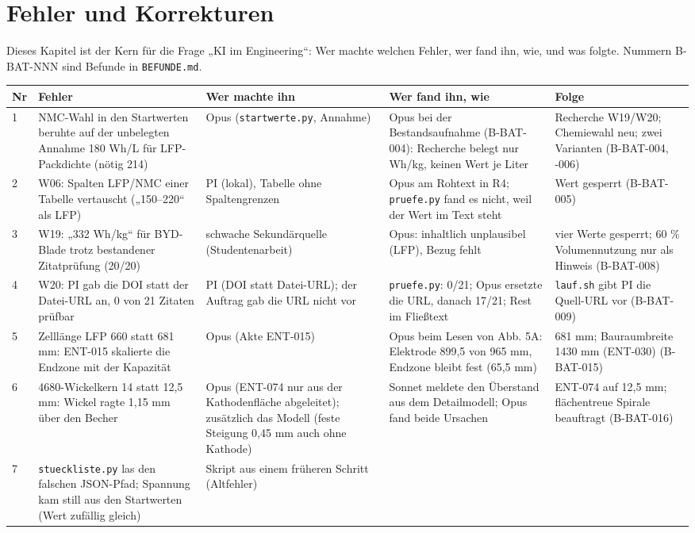 \documentclass[10pt,a4paper]{article}
\begin{document}
\section{Fehler und Korrekturen}\label{k:fehler}
Dieses Kapitel ist der Kern für die Frage „KI im Engineering“: Wer machte welchen Fehler, wer fand ihn, wie, und was folgte. Nummern B-BAT-NNN sind Befunde in \texttt{BEFUNDE.md}.
\begin{longtable}{@{}p{0.4cm}p{3.6cm}p{2.5cm}p{4.4cm}p{3.0cm}@{}}\toprule
\textbf{Nr} & \textbf{Fehler} & \textbf{Wer machte ihn} & \textbf{Wer fand ihn, wie} & \textbf{Folge}\\\midrule\endhead
1 & NMC-Wahl in den Startwerten beruhte auf der unbelegten Annahme 180 Wh/L für LFP-Packdichte (nötig 214) & Opus (\texttt{startwerte.py}, Annahme)
 & Opus bei der Bestandsaufnahme (B-BAT-004): Recherche belegt nur Wh/kg, keinen Wert je Liter & Recherche W19/W20; Chemiewahl neu; zwei Varianten (B-BAT-004, -006)\\
2 & W06: Spalten LFP/NMC einer Tabelle vertauscht („150–220“ als LFP) & PI (lokal), Tabelle ohne Spaltengrenzen
 & Opus am Rohtext in R4; \texttt{pruefe.py} fand es nicht, weil der Wert im Text steht & Wert gesperrt (B-BAT-005)\\
3 & W19: „332 Wh/kg“ für BYD-Blade trotz bestandener Zitatprüfung (20/20) & schwache Sekundärquelle (Studentenarbeit)
 & Opus: inhaltlich unplausibel (LFP), Bezug fehlt & vier Werte gesperrt; 60 \% Volumennutzung nur als Hinweis (B-BAT-008)\\
4 & W20: PI gab die DOI statt der Datei-URL an, 0 von 21 Zitaten prüfbar & PI (DOI statt Datei-URL); der Auftrag gab die URL nicht vor
 & \texttt{pruefe.py}: 0/21; Opus ersetzte die URL, danach 17/21; Rest im Fließtext & \texttt{lauf.sh} gibt PI die Quell-URL vor (B-BAT-009)\\
5 & Zelllänge LFP 660 statt 681 mm: ENT-015 skalierte die Endzone mit der Kapazität & Opus (Akte ENT-015)
 & Opus beim Lesen von Abb. 5A: Elektrode 899,5 von 965 mm, Endzone bleibt fest (65,5 mm) & 681 mm; Bauraumbreite 1430 mm (ENT-030) (B-BAT-015)\\
6 & 4680-Wickelkern 14 statt 12,5 mm: Wickel ragte 1,15 mm über den Becher & Opus (ENT-074 nur aus der Kathodenfläche abgeleitet); zusätzlich das Modell (feste Steigung 0,45 mm auch ohne Kathode)
 & Sonnet meldete den Überstand aus dem Detailmodell; Opus fand beide Ursachen & ENT-074 auf 12,5 mm; flächentreue Spirale beauftragt (B-BAT-016)\\
7 & \texttt{stueckliste.py} las den falschen JSON-Pfad; Spannung kam still aus den Startwerten (Wert zufällig gleich) & Skript aus einem früheren Schritt (Altfehler)

\end{longtable}
\end{document}
